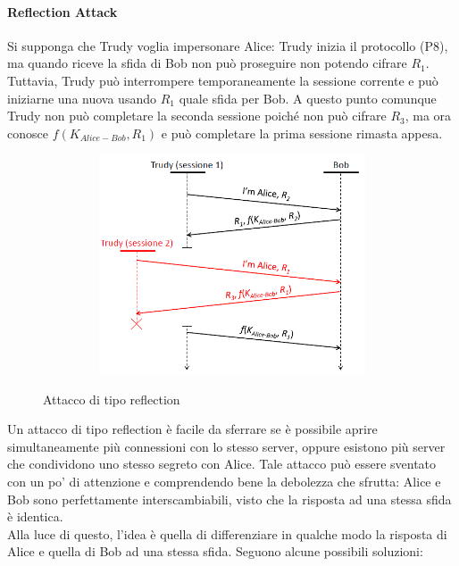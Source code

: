 \paragraph{Reflection Attack}
Si supponga che Trudy voglia impersonare Alice: Trudy inizia il protocollo (P8), ma quando riceve la sfida di Bob non può proseguire non potendo cifrare $R_{1}$. Tuttavia, Trudy può interrompere temporaneamente la sessione corrente e può iniziarne una nuova usando $R_{1}$ quale sfida per Bob. A questo punto comunque Trudy non può completare la seconda sessione poiché non può cifrare $R_{3}$, ma ora conosce $f(K_{Alice-Bob},R_{1})$ e può completare la prima sessione rimasta appesa.
\begin{figure}[htbp]
	\centering%
	\subfigure%
	{\includegraphics[height=6.5cm, width=12cm, keepaspectratio]{Immagini/autenticazione/ImgS39bis.png}}
	\caption{Attacco di tipo reflection}\label{fig:ImgS39bis} 	
\end{figure}
Un attacco di tipo reflection è facile da sferrare se è possibile aprire simultaneamente più connessioni con lo
stesso server, oppure esistono più server che condividono uno stesso segreto con Alice.
\newline \newline
Tale attacco può essere sventato con un po' di attenzione e comprendendo bene la debolezza che sfrutta: Alice e Bob sono perfettamente interscambiabili, visto che la risposta ad una stessa sfida è identica.\\
Alla luce di questo, l'idea è quella di differenziare in qualche modo la risposta di Alice e quella di Bob ad una stessa sfida. Seguono alcune possibili soluzioni:
